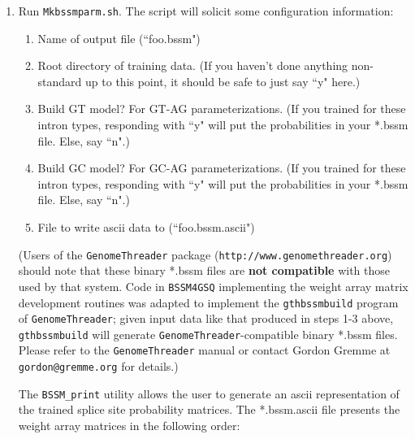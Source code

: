 \documentclass[11pt]{article}
\begin{document}
\begin{enumerate}
  \texttt{Mktraindata.sh} processes GT-AG introns by default.
  For other types, tune the DON and ACC variables (set these in CAPITAL letters!)
  and run it again.  This will not overwrite any existing output in
  the training\_data/ or exons\_introns/ directories so long as a
  different DON/ACC combination is used.  Rerunning the script
  using a DON/ACC pair whose results were already recorded will
  cause the original data to be overwritten.

  \item
  Run \texttt{Mkbssmparm.sh}.  The script will solicit some configuration
  information:

  \begin{enumerate}
    \item
    Name of output file (``foo.bssm")
    \item
    Root directory of training data.  (If you haven't done
    anything non-standard up to this point, it should be safe
    to just say ``y" here.)
    \item
    Build GT model?  For GT-AG parameterizations.  (If you trained
    for these intron types, responding with ``y" will put the
    probabilities in your *.bssm file.  Else, say ``n".)
    \item
    Build GC model?  For GC-AG parameterizations.  (If you trained
    for these intron types, responding with ``y" will put the
    probabilities in your *.bssm file.  Else, say ``n".)
    \item
    File to write ascii data to (``foo.bssm.ascii")
  \end{enumerate}

  (Users of the \texttt{GenomeThreader} package
  (\texttt{http://www.genomethreader.org})
  should note that these binary *.bssm files are \textbf{not compatible} with
  those used by that system.  Code in \texttt{BSSM4GSQ} implementing the
  weight array matrix development routines
  was adapted to implement the \texttt{gthbssmbuild} program
  of \texttt{GenomeThreader}; given input data like that produced in steps
  1-3 above, \texttt{gthbssmbuild} will generate \texttt{GenomeThreader}-compatible
  binary *.bssm files.
  Please refer to the \texttt{GenomeThreader} manual or
  contact Gordon Gremme at \texttt{gordon@gremme.org} for details.)

  The \texttt{BSSM\_print} utility allows the user to generate an ascii
  representation of the trained splice site probability matrices.
  The *.bssm.ascii file presents the weight array matrices in the following
  order:


\end{enumerate}
\end{document}
